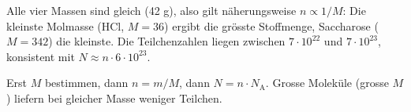 \begin{kontrolle}
Alle vier Massen sind gleich (42 g), also gilt näherungsweise
$n \propto 1/M$: Die kleinste Molmasse (HCl, $M=36$) ergibt die grösste
Stoffmenge, Saccharose ($M=342$) die kleinste. Die Teilchenzahlen liegen
zwischen $7\cdot10^{22}$ und $7\cdot10^{23}$, konsistent mit
$N \approx n \cdot 6\cdot10^{23}$.
\end{kontrolle}

\begin{merksatz}
Erst $M$ bestimmen, dann $n = m/M$, dann $N = n\cdot N_\mathrm{A}$. Grosse
Moleküle (grosse $M$) liefern bei gleicher Masse weniger Teilchen.
\end{merksatz}
